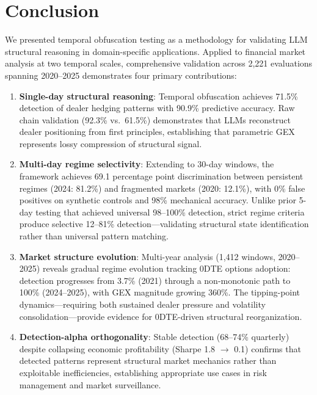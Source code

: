 \section{Conclusion}
\label{sec:conclusion}

We presented temporal obfuscation testing as a methodology for validating LLM structural reasoning in domain-specific applications. Applied to financial market analysis at two temporal scales, comprehensive validation across 2,221 evaluations spanning 2020--2025 demonstrates four primary contributions:

\begin{enumerate}
\item \textbf{Single-day structural reasoning}: Temporal obfuscation achieves 71.5\% detection of dealer hedging patterns with 90.9\% predictive accuracy. Raw chain validation (92.3\% vs.\ 61.5\%) demonstrates that LLMs reconstruct dealer positioning from first principles, establishing that parametric GEX represents lossy compression of structural signal.

\item \textbf{Multi-day regime selectivity}: Extending to 30-day windows, the framework achieves 69.1 percentage point discrimination between persistent regimes (2024: 81.2\%) and fragmented markets (2020: 12.1\%), with 0\% false positives on synthetic controls and 98\% mechanical accuracy. Unlike prior 5-day testing that achieved universal 98--100\% detection, strict regime criteria produce selective 12--81\% detection---validating structural state identification rather than universal pattern matching.

\item \textbf{Market structure evolution}: Multi-year analysis (1,412 windows, 2020--2025) reveals gradual regime evolution tracking 0DTE options adoption: detection progresses from 3.7\% (2021) through a non-monotonic path to 100\% (2024--2025), with GEX magnitude growing 360\%. The tipping-point dynamics---requiring both sustained dealer pressure and volatility consolidation---provide evidence for 0DTE-driven structural reorganization.

\item \textbf{Detection-alpha orthogonality}: Stable detection (68--74\% quarterly) despite collapsing economic profitability (Sharpe 1.8 $\rightarrow$ 0.1) confirms that detected patterns represent structural market mechanics rather than exploitable inefficiencies, establishing appropriate use cases in risk management and market surveillance.
\end{enumerate}

